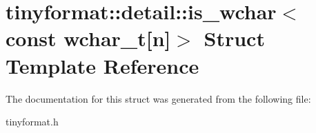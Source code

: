 \hypertarget{structtinyformat_1_1detail_1_1is__wchar_3_01const_01wchar__t[n]_4}{}\section{tinyformat\+:\+:detail\+:\+:is\+\_\+wchar$<$ const wchar\+\_\+t\mbox{[}n\mbox{]}$>$ Struct Template Reference}
\label{structtinyformat_1_1detail_1_1is__wchar_3_01const_01wchar__t[n]_4}


The documentation for this struct was generated from the following file\+:\begin{DoxyCompactItemize}
\item 
tinyformat.\+h\end{DoxyCompactItemize}
